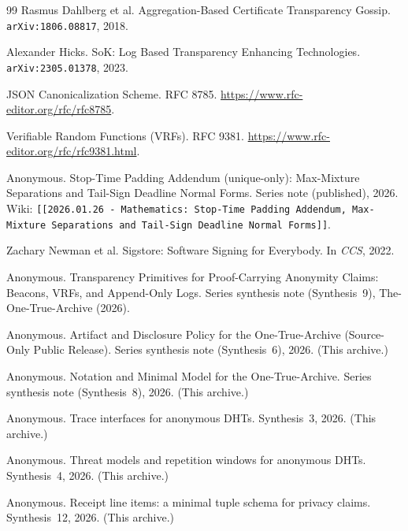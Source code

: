 \documentclass[11pt]{article}
\begin{document}
\begin{thebibliography}{99}
Rasmus Dahlberg et al.
\newblock Aggregation-Based Certificate Transparency Gossip.
\newblock \texttt{arXiv:1806.08817}, 2018.

Alexander Hicks.
\newblock SoK: Log Based Transparency Enhancing Technologies.
\newblock \texttt{arXiv:2305.01378}, 2023.

JSON Canonicalization Scheme.
\newblock RFC 8785.
\newblock \url{https://www.rfc-editor.org/rfc/rfc8785}.

Verifiable Random Functions (VRFs).
\newblock RFC 9381.
\newblock \url{https://www.rfc-editor.org/rfc/rfc9381.html}.

Anonymous.
\newblock Stop-Time Padding Addendum (unique-only): Max-Mixture Separations and Tail-Sign Deadline Normal Forms.
\newblock Series note (published), 2026.
\newblock Wiki: \texttt{[[2026.01.26 - Mathematics: Stop-Time Padding Addendum, Max-Mixture Separations and Tail-Sign Deadline Normal Forms]]}.

Zachary Newman et al.
\newblock Sigstore: Software Signing for Everybody.
\newblock In \emph{CCS}, 2022.



Anonymous.
\newblock Transparency Primitives for Proof-Carrying Anonymity Claims: Beacons, VRFs, and Append-Only Logs.
\newblock Series synthesis note (Synthesis~9), The-One-True-Archive (2026).

Anonymous.
\newblock Artifact and Disclosure Policy for the One-True-Archive (Source-Only Public Release).
\newblock Series synthesis note (Synthesis~6), 2026. (This archive.)


Anonymous.
\newblock Notation and Minimal Model for the One-True-Archive.
\newblock Series synthesis note (Synthesis~8), 2026. (This archive.)

Anonymous.
\newblock Trace interfaces for anonymous DHTs.
\newblock Synthesis~3, 2026. (This archive.)

Anonymous.
\newblock Threat models and repetition windows for anonymous DHTs.
\newblock Synthesis~4, 2026. (This archive.)


Anonymous.
\newblock Receipt line items: a minimal tuple schema for privacy claims.
\newblock Synthesis~12, 2026. (This archive.)


\end{thebibliography}
\end{document}
